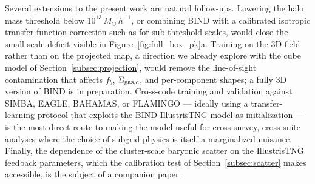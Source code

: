\documentclass[linenumbers,trackchanges, twocolumn]{aastex701}
\begin{document}
Several extensions to the present work are natural follow-ups. Lowering the halo mass threshold below $10^{13}\,M_\odot\,h^{-1}$, or combining \textsc{BIND} with a calibrated isotropic transfer-function correction such as \citet{Sharma2024} for sub-threshold scales, would close the small-scale deficit visible in Figure~\ref{fig:full_box_pk}a. Training on the 3D field rather than on the projected map, a direction we already explore with the cube model of Section~\ref{subsec:projection}, would remove the line-of-sight contamination that affects $f_b$, $\Sigma_{{\rm gas},c}$, and per-component shapes; a fully 3D version of \textsc{BIND} is in preparation. Cross-code training and validation against SIMBA, EAGLE, BAHAMAS, or FLAMINGO --- ideally using a transfer-learning protocol that exploits the \textsc{BIND}-IllustrisTNG model as initialization --- is the most direct route to making the model useful for cross-survey, cross-suite analyses where the choice of subgrid physics is itself a marginalized nuisance. Finally, the dependence of the cluster-scale baryonic scatter on the IllustrisTNG feedback parameters, which the calibration test of Section~\ref{subsec:scatter} makes accessible, is the subject of a companion paper.


\begin{acknowledgments}

\end{acknowledgments}

\begin{contribution}



\end{contribution}
\end{document}
